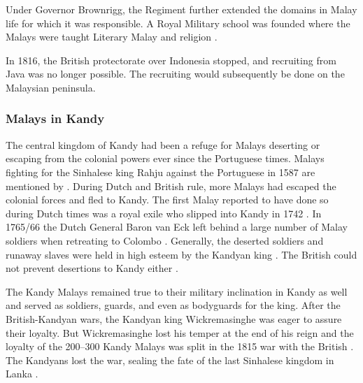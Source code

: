 Under Governor Brownrigg, the Regiment further extended the domains in Malay life for which it was responsible. A Royal Military school was founded where the Malays were taught Literary Malay and religion \citep[96]{Hussainmiya1990}.

In 1816, the British protectorate over Indonesia stopped, and
recruiting from Java was no longer possible. The recruiting would
subsequently be done on the Malaysian peninsula.



\subsubsection{Malays in Kandy}\label{sec:slmbg:MalaysinKandy}
The central kingdom of Kandy had been a refuge for Malays
deserting or escaping from the colonial powers ever since the
Portuguese times. Malays fighting for the Sinhalese king Rahju
against the Portuguese in 1587 are mentioned by
\citet[26]{Powell1973}. During Dutch and British rule, more Malays
had escaped the colonial forces and fled to Kandy.  The first
Malay  reported to have done so during Dutch times was a royal
exile who slipped into Kandy in 1742 \citep[69]{Hussainmiya1990}.
In 1765/66 the Dutch General Baron van Eck left behind a large
number of Malay soldiers when retreating to Colombo
\citep[37f]{Powell1973}. Generally, the deserted soldiers and
runaway slaves were held in high esteem by the Kandyan king
\citep[78]{Hussainmiya1990}. The British could not prevent
desertions to Kandy either \citep[67]{Hussainmiya1990}.

The Kandy Malays remained true to their military inclination  in Kandy as well and served as soldiers, guards, and even as bodyguards for the king. After the British-Kandyan wars, the Kandyan king Wickremasinghe was eager to assure their loyalty. But Wickremasinghe lost his temper at the end of his reign \citep[71]{Hussainmiya1990} and the loyalty of the 200--300 Kandy Malays was split in the 1815 war with the British \citep[82f]{Hussainmiya1990}. The Kandyans lost the war, sealing the fate  of the  last Sinhalese kingdom in Lanka \citep[220ff]{Desilva1981}.

